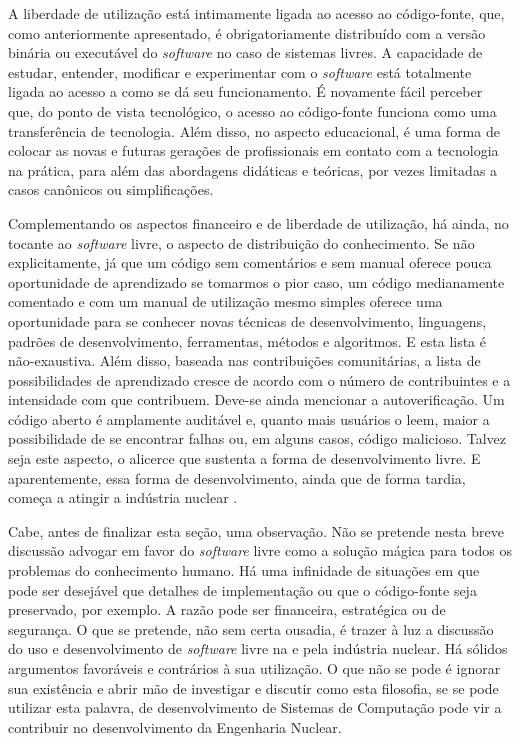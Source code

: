 A liberdade de utilização está intimamente ligada ao acesso ao código-fonte, que, como anteriormente apresentado,
é obrigatoriamente distribuído com a versão binária ou executável do \textit{software} no caso de sistemas
livres. A capacidade de estudar, entender, modificar e experimentar
com o \textit{software} está totalmente ligada ao acesso a como se dá seu funcionamento. É novamente fácil perceber que,
do ponto de vista tecnológico, o acesso ao código-fonte funciona como uma transferência de tecnologia. Além disso, no
aspecto educacional, é uma forma de colocar as novas e futuras gerações de profissionais em contato com a tecnologia na
prática, para além das abordagens didáticas e teóricas, por vezes limitadas a casos canônicos ou simplificações. 



Complementando os aspectos financeiro e de liberdade de utilização, há ainda, no tocante ao \textit{software} livre,
o aspecto de distribuição do conhecimento. Se não explicitamente, já que um código sem comentários e sem manual oferece
pouca oportunidade de aprendizado se tomarmos o pior caso, um código medianamente comentado e com um manual de utilização mesmo
simples oferece uma oportunidade para se conhecer novas técnicas de desenvolvimento, linguagens, padrões de desenvolvimento, ferramentas,
métodos e algoritmos. E esta lista é não-exaustiva. Além disso, baseada nas contribuições comunitárias, a lista de possibilidades
de aprendizado cresce de acordo com o número de contribuintes e a intensidade com que contribuem. Deve-se ainda mencionar
a autoverificação. Um código aberto é amplamente auditável e, quanto mais usuários o leem, maior a possibilidade de se
encontrar falhas ou, em alguns casos, código malicioso. Talvez seja este aspecto, o alicerce que sustenta a forma de desenvolvimento
livre. E aparentemente, essa forma de desenvolvimento, ainda que de forma tardia, começa a atingir a indústria nuclear
\cite{Romano2013, Boyd2014, Theler2014b, Huff2016}.


Cabe, antes de finalizar esta seção, uma observação. Não se pretende nesta breve discussão advogar em favor do \textit{software}
livre como a solução mágica para todos os problemas do conhecimento humano. Há uma infinidade de situações em que pode ser desejável
que detalhes de implementação ou que o código-fonte seja preservado, por exemplo. A razão pode ser financeira, estratégica ou de segurança.
O que se pretende, não sem certa ousadia, é trazer à luz a discussão do uso e desenvolvimento de \textit{software} livre na e pela indústria nuclear. Há sólidos
argumentos favoráveis e contrários à sua utilização. O que não se pode é ignorar sua existência e abrir mão de investigar e discutir como
esta filosofia, se se pode utilizar esta palavra, de desenvolvimento de Sistemas de Computação pode vir a contribuir no desenvolvimento
da Engenharia Nuclear.

